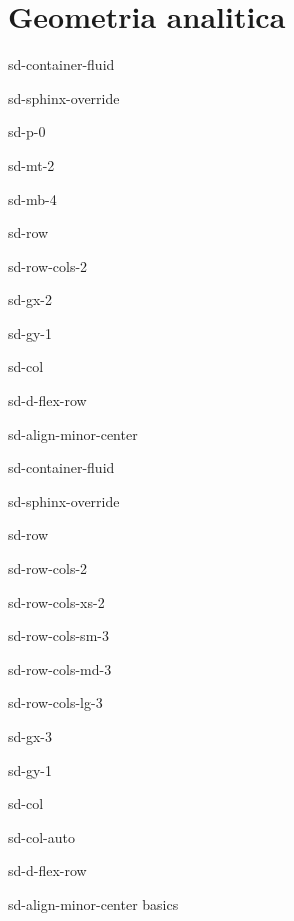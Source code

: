 \documentclass[letterpaper,10pt,italian]{jupyterBook}
\begin{document}
\sphinxstepscope


\part{Geometria analitica}

\sphinxstepscope

\begin{sphinxuseclass}{sd-container-fluid}
\begin{sphinxuseclass}{sd-sphinx-override}
\begin{sphinxuseclass}{sd-p-0}
\begin{sphinxuseclass}{sd-mt-2}
\begin{sphinxuseclass}{sd-mb-4}
\begin{sphinxuseclass}{sd-row}
\begin{sphinxuseclass}{sd-row-cols-2}
\begin{sphinxuseclass}{sd-gx-2}
\begin{sphinxuseclass}{sd-gy-1}
\begin{sphinxuseclass}{sd-col}
\begin{sphinxuseclass}{sd-d-flex-row}
\begin{sphinxuseclass}{sd-align-minor-center}
\begin{sphinxuseclass}{sd-container-fluid}
\begin{sphinxuseclass}{sd-sphinx-override}
\begin{sphinxuseclass}{sd-row}
\begin{sphinxuseclass}{sd-row-cols-2}
\begin{sphinxuseclass}{sd-row-cols-xs-2}
\begin{sphinxuseclass}{sd-row-cols-sm-3}
\begin{sphinxuseclass}{sd-row-cols-md-3}
\begin{sphinxuseclass}{sd-row-cols-lg-3}
\begin{sphinxuseclass}{sd-gx-3}
\begin{sphinxuseclass}{sd-gy-1}
\begin{sphinxuseclass}{sd-col}
\begin{sphinxuseclass}{sd-col-auto}
\begin{sphinxuseclass}{sd-d-flex-row}
\begin{sphinxuseclass}{sd-align-minor-center}
\sphinxAtStartPar
basics


\end{sphinxuseclass}
\end{sphinxuseclass}
\end{sphinxuseclass}
\end{sphinxuseclass}
\end{sphinxuseclass}
\end{sphinxuseclass}
\end{sphinxuseclass}
\end{sphinxuseclass}
\end{sphinxuseclass}
\end{sphinxuseclass}
\end{sphinxuseclass}
\end{sphinxuseclass}
\end{sphinxuseclass}
\end{sphinxuseclass}
\end{sphinxuseclass}
\end{sphinxuseclass}
\end{sphinxuseclass}
\end{sphinxuseclass}
\end{sphinxuseclass}
\end{sphinxuseclass}
\end{sphinxuseclass}
\end{sphinxuseclass}
\end{sphinxuseclass}
\end{sphinxuseclass}
\end{sphinxuseclass}
\end{sphinxuseclass}
\end{document}
